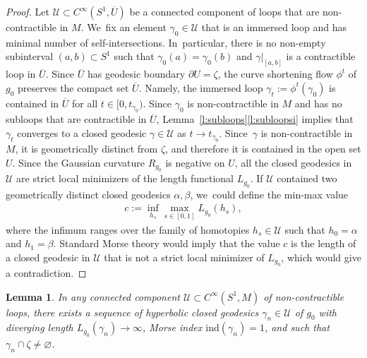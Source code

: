 \documentclass[11pt]{article}
\newcommand{\UU}{\mathcal{U}}
\newcommand{\ind}{\mathrm{ind}}
\theoremstyle{plain}
\newtheorem{Lemma}[Thm]{Lemma}
\theoremstyle{definition}
\begin{document}
\begin{proof}
Let $\UU\subset C^\infty(S^1,\overline U)$ be a connected component of loops that are non-con\-tractible in $M$. We~fix an element $\gamma_0\in\UU$ that is an immersed loop and has minimal number of self-intersections. In~particular, there is no non-empty subinterval $(a,b)\subset S^1$ such that $\gamma_0(a)=\gamma_0(b)$ and $\gamma|_{[a,b]}$ is a contractible loop in $\overline U$. Since $\overline U$ has geodesic boundary $\partial U=\zeta$, the curve shortening flow $\phi^t$ of $g_0$ preserves the compact set $\overline U$. Namely, the immersed loop $\gamma_t:=\phi^t(\gamma_0)$ is contained in $\overline U$ for all $t\in[0,t_{\gamma_0})$. Since $\gamma_0$ is non-contractible in $M$ and has no subloops that are contractible in $\overline U$, Lemma~\ref{l:subloops}\eqref{l:subloopsi} implies that $\gamma_t$ converges to a closed geodesic $\gamma\in\UU$ as $t\to t_{\gamma_0}$.
Since~$\gamma$ is non-contractible in $M$, it is geometrically distinct from $\zeta$, and therefore it is contained in the open set $U$.
Since the Gaussian curvature $R_{g_0}$ is negative on $U$, all the closed geodesics in $\UU$ are strict local minimizers of the length functional $L_{g_0}$.
If $\UU$ contained two geometrically distinct closed geodesics $\alpha,\beta$, we~could define the min-max value
\begin{align*}
c:=\inf_{h_s} \max_{s\in[0,1]} L_{g_0}(h_s),
\end{align*}
where the infimum ranges over the family of homotopies $h_s\in\UU$ such that $h_0=\alpha$ and $h_1=\beta$. Standard Morse theory would imply that the value $c$ is the length of a closed geodesic in $\UU$ that is not a strict local minimizer of $L_{g_0}$, which would give a contradiction.
\end{proof}

\begin{Lemma}\label{l:infinitely_many_Donnay}
In any connected component $\UU\subset C^\infty(S^1,M)$ of non-contractible loops, there exists a sequence of hyperbolic closed geodesics $\gamma_n\in\UU$ of $g_0$ with diverging length $L_{g_0}(\gamma_n)\to\infty$, Morse index $\ind(\gamma_n)=1$, and such that $\gamma_n\cap\zeta\neq\varnothing$.
\end{Lemma}
\end{document}
